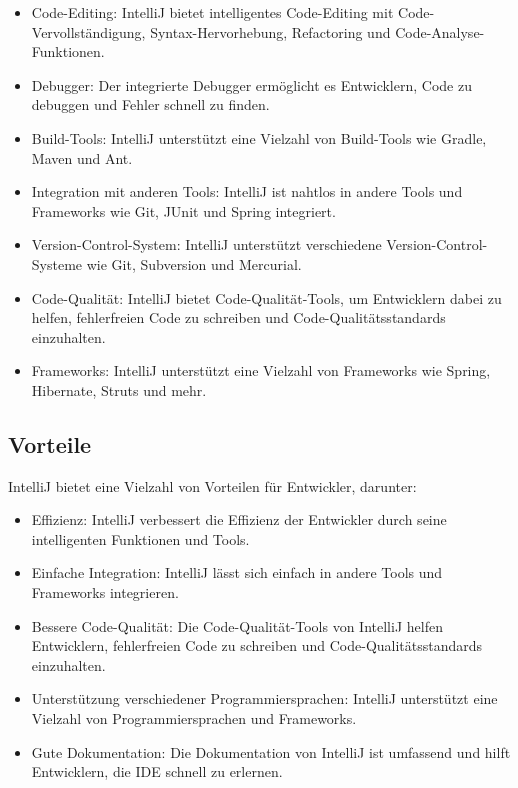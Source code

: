 \begin{itemize}
\item Code-Editing: IntelliJ bietet intelligentes Code-Editing mit Code-Vervollständigung, Syntax-Hervorhebung, Refactoring und Code-Analyse-Funktionen.
\item Debugger: Der integrierte Debugger ermöglicht es Entwicklern, Code zu debuggen und Fehler schnell zu finden.
\item Build-Tools: IntelliJ unterstützt eine Vielzahl von Build-Tools wie Gradle, Maven und Ant.
\item Integration mit anderen Tools: IntelliJ ist nahtlos in andere Tools und Frameworks wie Git, JUnit und Spring integriert.
\item Version-Control-System: IntelliJ unterstützt verschiedene Version-Control-Systeme wie Git, Subversion und Mercurial.
\item Code-Qualität: IntelliJ bietet Code-Qualität-Tools, um Entwicklern dabei zu helfen, fehlerfreien Code zu schreiben und Code-Qualitätsstandards einzuhalten.
\item Frameworks: IntelliJ unterstützt eine Vielzahl von Frameworks wie Spring, Hibernate, Struts und mehr.
\end{itemize}
\pagebreak

\subsection{Vorteile}

IntelliJ bietet eine Vielzahl von Vorteilen für Entwickler, darunter:

\begin{itemize}
\item Effizienz: IntelliJ verbessert die Effizienz der Entwickler durch seine intelligenten Funktionen und Tools.
\item Einfache Integration: IntelliJ lässt sich einfach in andere Tools und Frameworks integrieren.
\item Bessere Code-Qualität: Die Code-Qualität-Tools von IntelliJ helfen Entwicklern, fehlerfreien Code zu schreiben und Code-Qualitätsstandards einzuhalten.
\item Unterstützung verschiedener Programmiersprachen: IntelliJ unterstützt eine Vielzahl von Programmiersprachen und Frameworks.
\item Gute Dokumentation: Die Dokumentation von IntelliJ ist umfassend und hilft Entwicklern, die IDE schnell zu erlernen.
\end{itemize}